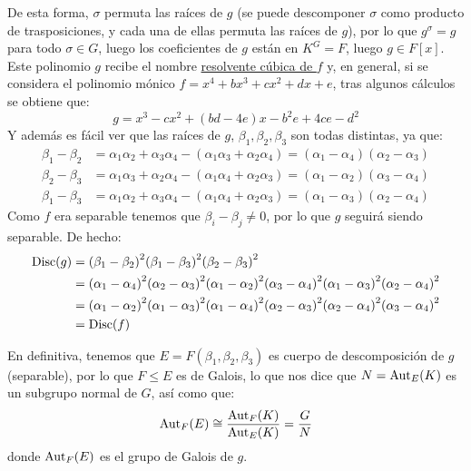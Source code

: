 \begin{ejemplo}
    De esta forma, $\sigma$ permuta las raíces de $g$ (se puede descomponer $\sigma$ como producto de trasposiciones, y cada una de ellas permuta las raíces de $g$), por lo que $g^\sigma = g$ para todo $\sigma\in G$, luego los coeficientes de $g$ están en $K^G = F$, luego $g\in F[x]$. Este polinomio $g$ recibe el nombre \underline{resolvente cúbica de $f$} y, en general, si se considera el polinomio mónico $f = x^4+bx^3+cx^2+dx+e$, tras algunos cálculos se obtiene que:
    \begin{equation*}
        g = x^3-cx^2 + (bd-4e)x - b^2 e + 4ce - d^2
    \end{equation*}
    Y además es fácil ver que las raíces de $g$, $\beta_1,\beta_2,\beta_3$ son todas distintas, ya que:
    \begin{align*}
        \beta_1 - \beta_2 &= \alpha_1\alpha_2 + \alpha_3\alpha_4 - (\alpha_1\alpha_3 + \alpha_2\alpha_4) = (\alpha_1-\alpha_4)(\alpha_2-\alpha_3)\\
        \beta_2 - \beta_3 &= \alpha_1\alpha_3 + \alpha_2\alpha_4 - (\alpha_1\alpha_4 + \alpha_2\alpha_3) = (\alpha_1-\alpha_2)(\alpha_3-\alpha_4)\\
        \beta_1 - \beta_3 &= \alpha_1\alpha_2 + \alpha_3\alpha_4 - (\alpha_1\alpha_4 + \alpha_2\alpha_3) = (\alpha_1-\alpha_3)(\alpha_2-\alpha_4)
    \end{align*}
    Como $f$ era separable tenemos que $\beta_i-\beta_j \neq 0$, por lo que $g$ seguirá siendo separable. De hecho:
    \begin{align*}
        \operatorname{Disc}(g) &= {(\beta_1-\beta_2)}^2{(\beta_1-\beta_3)}^2{(\beta_2-\beta_3)}^2 \\
        &= {(\alpha_1-\alpha_4)}^2{(\alpha_2-\alpha_3)}^2{(\alpha_1-\alpha_2)}^2{(\alpha_3-\alpha_4)}^2{(\alpha_1-\alpha_3)}^2{(\alpha_2-\alpha_4)}^2 \\
        &= {(\alpha_1-\alpha_2)}^2{(\alpha_1-\alpha_3)}^2{(\alpha_1-\alpha_4)}^2{(\alpha_2-\alpha_3)}^2{(\alpha_2-\alpha_4)}^2{(\alpha_3-\alpha_4)}^2 \\
        &= \operatorname{Disc}(f)
    \end{align*}

    \noindent
    En definitiva, tenemos que $E = F(\beta_1,\beta_2,\beta_3)$ es cuerpo de descomposición de $g$ (separable), por lo que $F\leq E$ es de Galois, lo que nos dice que $N = \operatorname{Aut}_E(K)$ es un subgrupo normal de $G$, así como que:
    \begin{equation*}
        \operatorname{Aut}_F(E) \cong \frac{\operatorname{Aut}_F(K)}{\operatorname{Aut}_E(K)} = \frac{G}{N}
    \end{equation*}
    donde $\operatorname{Aut}_F(E)$ es el grupo de Galois de $g$.\\


\end{ejemplo}
